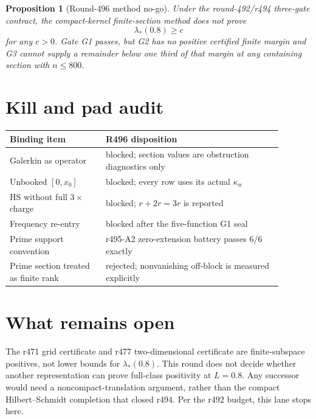 \documentclass[11pt]{article}
\newtheorem{proposition}{Proposition}
\begin{document}
\begin{proposition}[Round-496 method no-go]
Under the round-492/r494 three-gate contract, the compact-kernel
finite-section method does not prove
\[
 \lambda_*(0.8)\ge c
\]
for any $c>0$.  Gate G1 passes, but G2 has no positive certified
finite margin and G3 cannot supply a remainder below one third of
that margin at any containing section with $n\le800$.
\end{proposition}

\section{Kill and pad audit}

\begin{center}
\small
\begin{tabular}{@{}p{0.31\linewidth}p{0.58\linewidth}@{}}
\toprule
Binding item & R496 disposition\\
\midrule
Galerkin as operator & blocked; section values are obstruction
diagnostics only\\
Unbooked $[0,x_0]$ & blocked; every row uses its actual $\kappa_w$\\
HS without full $3\times$ charge & blocked; $r+2r=3r$ is reported\\
Frequency re-entry & blocked after the five-function G1 seal\\
Prime support convention & r495-A2 zero-extension battery passes
$6/6$ exactly\\
Prime section treated as finite rank & rejected; nonvanishing
off-block is measured explicitly\\
\bottomrule
\end{tabular}
\end{center}

\section{What remains open}

The r471 grid certificate and r477 two-dimensional certificate are
finite-subspace positives, not lower bounds for $\lambda_*(0.8)$.
This round does not decide whether another representation can prove
full-class positivity at $L=0.8$.  Any successor would need a
noncompact-translation argument, rather than the compact
Hilbert--Schmidt completion that closed r494.  Per the r492 budget,
this lane stops here.
\end{document}
